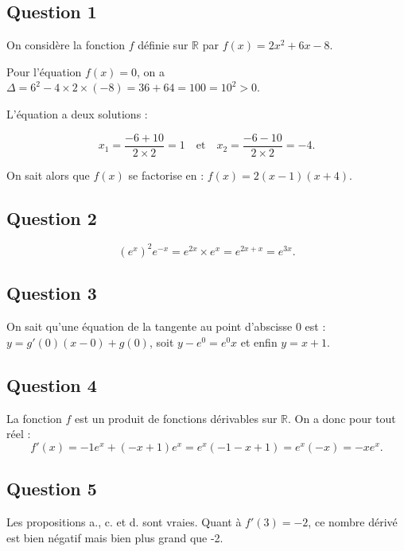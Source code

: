 \subsection*{Question 1}
	
	On considère la fonction \(f\) définie sur \(\mathbb{R}\) par \(f(x) = 2x^2 + 6x - 8\).
	
	Pour l’équation \(f(x) = 0\), on a \(\Delta = 6^2 - 4 \times 2 \times (-8) = 36 + 64 = 100 = 10^2 > 0\).
	
	L’équation a deux solutions :
	
	\[
	x_1 = \dfrac{-6 + 10}{2 \times 2} = 1 \quad \text{et} \quad x_2 = \dfrac{-6 - 10}{2 \times 2} = -4.
	\]
	
	On sait alors que \(f(x)\) se factorise en : \(f(x) = 2(x - 1)(x + 4)\).
	
	\subsection*{Question 2}
	
	\[
	\left( e^x \right)^2 e^{-x} = e^{2x} \times e^x = e^{2x + x} = e^{3x}.
	\]
	
	\subsection*{Question 3}
	
	On sait qu’une équation de la tangente au point d’abscisse 0 est :\\
$y =  g'(0)(x - 0)+g(0)$,  soit $ y - e^0 = e^0 x$  et enfin  $y = x + 1$.
	
	
	\subsection*{Question 4}
	
	La fonction \(f\) est un produit de fonctions dérivables sur \(\mathbb{R}\). On a donc pour tout réel :
	\[
	f'(x) = -1 e^x + (-x + 1) e^x = e^x (-1 - x + 1) = e^x (-x) = -x e^x.
	\]
	
	\subsection*{Question 5}
	
	Les propositions a., c. et d. sont vraies. Quant à \(f'(3) = -2\), ce nombre dérivé est bien négatif mais bien plus grand que -2.
